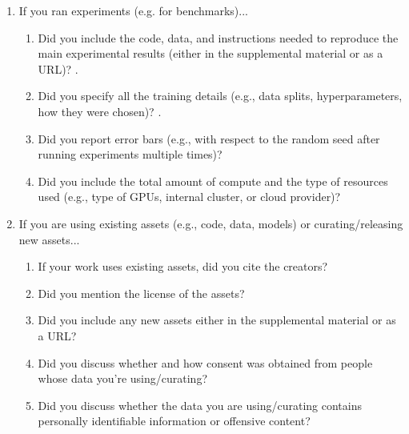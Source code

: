 \documentclass{article}
\begin{document}
\begin{enumerate}
\item If you ran experiments (e.g. for benchmarks)...
\begin{enumerate}
  \item Did you include the code, data, and instructions needed to reproduce the main experimental results (either in the supplemental material or as a URL)?
    .
  \item Did you specify all the training details (e.g., data splits, hyperparameters, how they were chosen)?
    .
	\item Did you report error bars (e.g., with respect to the random seed after running experiments multiple times)?
	\item Did you include the total amount of compute and the type of resources used (e.g., type of GPUs, internal cluster, or cloud provider)?

\end{enumerate}

\item If you are using existing assets (e.g., code, data, models) or curating/releasing new assets...
\begin{enumerate}
  \item If your work uses existing assets, did you cite the creators?
  \item Did you mention the license of the assets?
  \item Did you include any new assets either in the supplemental material or as a URL?
  \item Did you discuss whether and how consent was obtained from people whose data you're using/curating?
  \item Did you discuss whether the data you are using/curating contains personally identifiable information or offensive content?


\end{enumerate}
\end{enumerate}
\end{document}
